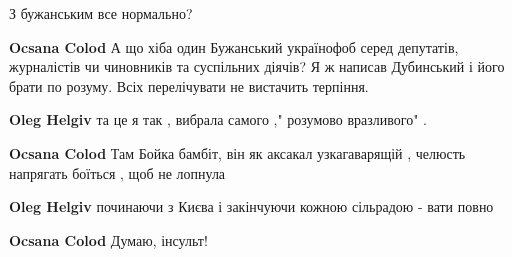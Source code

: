 \begin{itemize}
 
З бужанським все нормально?

\begin{itemize}
 
\textbf{Ocsana Colod} А що хіба один Бужанський українофоб серед депутатів, журналістів чи чиновників та суспільних діячів? Я ж написав Дубинський і його брати по розуму. Всіх перелічувати не вистачить терпіння.

 
\textbf{Oleg Helgiv} та це я так , вибрала самого ," розумово вразливого" .

 
\textbf{Ocsana Colod} Там Бойка бамбіт, він як аксакал узкагаварящій , челюсть напрягать боїться , щоб не лопнула

 
\textbf{Oleg Helgiv} починаючи з Києва і закінчуючи кожною сільрадою - вати повно

 
\textbf{Ocsana Colod} Думаю, інсульт!


\end{itemize}
\end{itemize}
